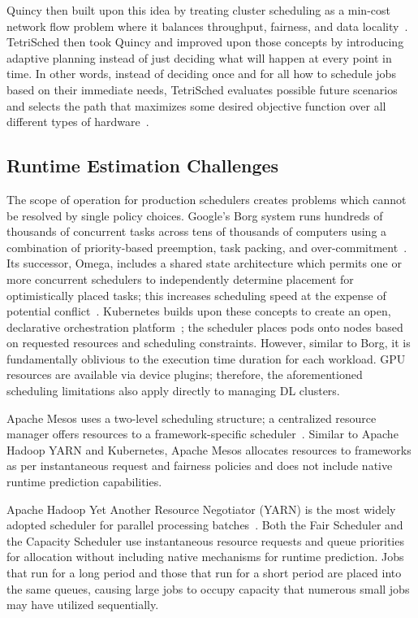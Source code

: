 \clearpage
Quincy then built upon this idea by treating cluster scheduling as a min-cost network flow problem where it balances throughput, fairness, and data locality~\cite{isard2009quincy}. TetriSched then took Quincy and improved upon those concepts by introducing adaptive planning instead of just deciding what will happen at every point in time. In other words, instead of deciding once and for all how to schedule jobs based on their immediate needs, TetriSched evaluates possible future scenarios and selects the path that maximizes some desired objective function over all different types of hardware~\cite{tumanov2016tetrisched}.

\subsection{Runtime Estimation Challenges}

The scope of operation for production schedulers creates problems which cannot be resolved by single policy choices. Google's Borg system runs hundreds of thousands of concurrent tasks across tens of thousands of computers using a combination of priority-based preemption, task packing, and over-commitment~\cite{verma2015large}. Its successor, Omega, includes a shared state architecture which permits one or more concurrent schedulers to independently determine placement for optimistically placed tasks; this increases scheduling speed at the expense of potential conflict~\cite{schwarzkopf2013omega}. Kubernetes builds upon these concepts to create an open, declarative orchestration platform~\cite{burns2016borg}; the scheduler places pods onto nodes based on requested resources and scheduling constraints. However, similar to Borg, it is fundamentally oblivious to the execution time duration for each workload. GPU resources are available via device plugins; therefore, the aforementioned scheduling limitations also apply directly to managing DL clusters.

Apache Mesos uses a two-level scheduling structure; a centralized resource manager offers resources to a framework-specific scheduler~\cite{hindman2011mesos}. Similar to Apache Hadoop YARN and Kubernetes, Apache Mesos allocates resources to frameworks as per instantaneous request and fairness policies and does not include native runtime prediction capabilities.

\clearpage
Apache Hadoop Yet Another Resource Negotiator (YARN) is the most widely adopted scheduler for parallel processing batches~\cite{vavilapalli2013yarn}. Both the Fair Scheduler and the Capacity Scheduler use instantaneous resource requests and queue priorities for allocation without including native mechanisms for runtime prediction. Jobs that run for a long period and those that run for a short period are placed into the same queues, causing large jobs to occupy capacity that numerous small jobs may have utilized sequentially.

